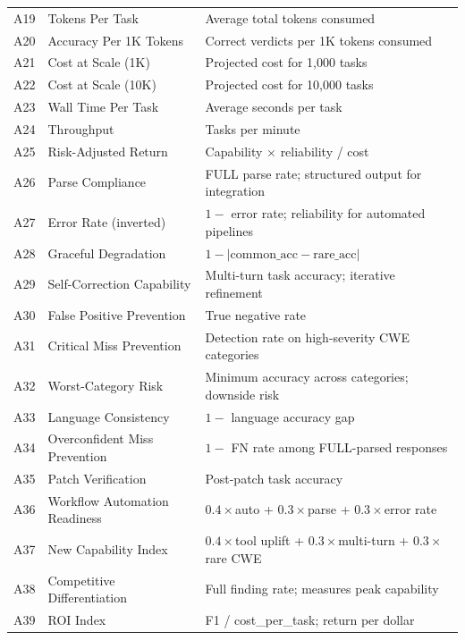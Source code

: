 \documentclass[10pt,twocolumn]{article}
\begin{document}
\begin{table}[t]
\begin{tabular}{@{}r l p{7.5cm}@{}}
A19 & Tokens Per Task                     & Average total tokens consumed \\
A20 & Accuracy Per 1K Tokens              & Correct verdicts per 1K tokens consumed \\
A21 & Cost at Scale (1K)                  & Projected cost for 1,000 tasks \\
A22 & Cost at Scale (10K)                 & Projected cost for 10,000 tasks \\
A23 & Wall Time Per Task                  & Average seconds per task \\
A24 & Throughput                          & Tasks per minute \\
A25 & Risk-Adjusted Return                & Capability ${\times}$ reliability / cost \\
A26 & Parse Compliance                    & FULL parse rate; structured output for integration \\
A27 & Error Rate (inverted)               & $1 -$ error rate; reliability for automated pipelines \\
A28 & Graceful Degradation                & $1 - |\text{common\_acc} - \text{rare\_acc}|$ \\
A29 & Self-Correction Capability          & Multi-turn task accuracy; iterative refinement \\
A30 & False Positive Prevention           & True negative rate \\
A31 & Critical Miss Prevention            & Detection rate on high-severity CWE categories \\
A32 & Worst-Category Risk                 & Minimum accuracy across categories; downside risk \\
A33 & Language Consistency                 & $1 -$ language accuracy gap \\
A34 & Overconfident Miss Prevention       & $1 -$ FN rate among FULL-parsed responses \\
A35 & Patch Verification                  & Post-patch task accuracy \\
A36 & Workflow Automation Readiness       & $0.4{\times}$auto + $0.3{\times}$parse + $0.3{\times}$error rate \\
A37 & New Capability Index                & $0.4{\times}$tool uplift + $0.3{\times}$multi-turn + $0.3{\times}$rare CWE \\
A38 & Competitive Differentiation         & Full finding rate; measures peak capability \\
A39 & ROI Index                           & F1 / cost\_per\_task; return per dollar \\

\end{tabular}
\end{table}
\end{document}
